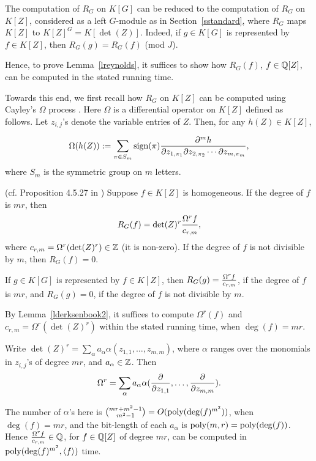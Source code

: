 \documentclass[11pt]{article}
\begin{document}
The computation of $R_G$ on $K[G]$ can be reduced to the computation of  $R_G$ on $K[Z]$, considered as a left $G$-module as in
Section~\ref{sstandard},  where $R_G$ maps $K[Z]$ to $K[Z]^G=K[\det(Z)]$. Indeed, 
if $g \in K[G]$ is represented by $f \in K[Z]$,  then
$R_G(g)=R_G(f)$ (mod $J$).

Hence, to prove Lemma~\ref{lreynolds}, it suffices to show how $R_G(f)$, $f \in \mathbb{Q}[Z]$,
can be computed in the stated running time. 

Towards this end,  we first recall 
how  $R_G$ on $K[Z]$ can be computed 
using Cayley's $\Omega$ process  \cite{hilbert}. 
Here $\Omega$ is a differential operator on $K[Z]$ defined as follows. Let $z_{i,j}$'s denote the variable entries of $Z$.
Then, for any $h(Z) \in K[Z]$, 

\[ \Omega(h(Z)):= \sum_{\pi \in S_m} \mbox{sign}(\pi) 
{\frac {\partial^m h} {\partial z_{1,\pi_1} \partial z_{2,\pi_2} \cdots \partial z_{m,\pi_m}}},\] 
where $S_m$ is the symmetric group on $m$ letters.


\begin{lemma} (cf. Proposition 4.5.27 in \cite{derksenbook}) \label{lderksenbook2}
Suppose $f \in K[Z]$ is homogeneous. If the  degree of $f$ is $m r$, then
\[R_G(f)= \det(Z)^{r} {\frac {\Omega^r f} {c_{r,m}}},\] 
where $c_{r,m}=\Omega^r(\det(Z)^r) \in \mathbb{Z}$ (it is non-zero).  If the degree of $f$ is not divisible by $m$,
then $R_G(f)=0$.

If $g \in K[G]$ is represented by $f \in K[Z]$, then $R_G(g)={\frac {\Omega^r f} {c_{r,m}}}$, if 
the degree of $f$ is $m r$,  and $R_G(g)=0$, if the degree of $f$ is not divisible by $m$.
\end{lemma} 

By Lemma~\ref{lderksenbook2}, it suffices to compute  $\Omega^r(f)$ and 
$c_{r,m}=\Omega^r(\det(Z)^r)$ within the stated running time, when $\deg(f)=mr$.

Write $\det(Z)^r=\sum_\alpha a_\alpha \alpha(z_{1,1},\ldots,z_{m,m})$, where $\alpha$ ranges over 
the monomials in $z_{i,j}$'s of degree $m r$, and $a_\alpha \in \mathbb{Z}$. Then 
\[
\Omega^r=\sum_\alpha a_\alpha \alpha({\frac {\partial} {\partial  z_{1,1}}},\ldots, {\frac {\partial} {\partial z_{m,m}}}).
\] 

The number of $\alpha$'s  here is ${mr + m^2 -1 \choose m^2 -1}= O({\mbox {poly}}(\deg(f)^{m^2}))$, when $\deg(f)=mr$,
and the bit-length of each $a_\alpha$ is ${\mbox {poly}}(m,r)={\mbox {poly}}(\deg(f))$. 
Hence  ${\frac {\Omega^r f} {c_{r,m}}} \in \mathbb{Q}$, for $f \in \mathbb{Q}[Z]$ of degree $m r$,
can be  computed in ${\mbox {poly}}(\deg(f)^{m^2},\langle f \rangle)$ time.
\end{document}
